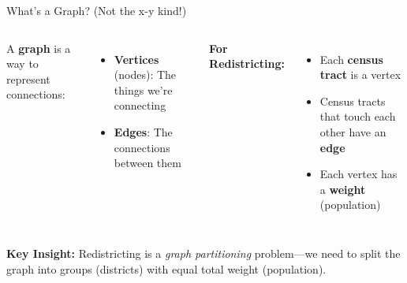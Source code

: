 \documentclass[aspectratio=169]{beamer}
\begin{document}
\begin{frame}{What's a Graph? (Not the x-y kind!)}
\begin{columns}
A \textbf{graph} is a way to represent connections:
\begin{itemize}
\item \textbf{Vertices} (nodes): The things we're connecting
\item \textbf{Edges}: The connections between them
\end{itemize}

\vspace{1em}
\textbf{For Redistricting:}
\begin{itemize}
\item Each \textbf{census tract} is a vertex
\item Census tracts that touch each other have an \textbf{edge}
\item Each vertex has a \textbf{weight} (population)
\end{itemize}

\end{columns}

\vspace{1em}
\textbf{Key Insight:} Redistricting is a \textit{graph partitioning} problem—we need to split the graph into groups (districts) with equal total weight (population).
\end{frame}
\end{document}
